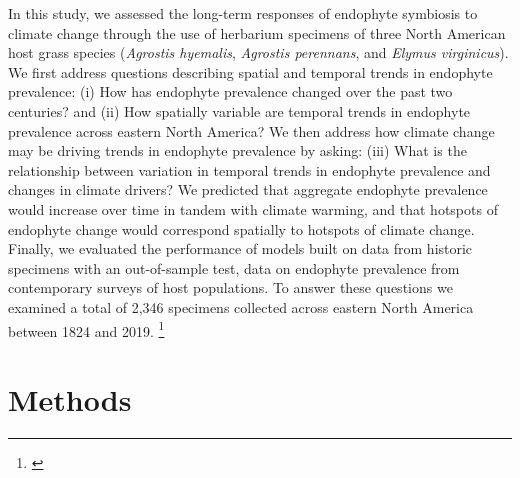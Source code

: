 \documentclass[11pt]{article}
\newcommand{\tom}[2]{{\color{red}{#1}}\footnote{\textit{\color{red}{#2}}}}
\begin{document}
In this study, we assessed the long-term responses of endophyte symbiosis to climate change through the use of herbarium specimens of three North American host grass species (\emph{Agrostis hyemalis}, \emph{Agrostis perennans}, and \emph{Elymus virginicus}).
We first address questions describing spatial and temporal trends in endophyte prevalence: (i) How has endophyte prevalence changed over the past two centuries? and (ii) How spatially variable are temporal trends in endophyte prevalence across eastern North America?
We then address how climate change may be driving trends in endophyte prevalence by asking: (iii) What is the relationship between variation in temporal trends in endophyte prevalence and changes in climate drivers?
We predicted that aggregate endophyte prevalence would increase over time in tandem with climate warming, and that hotspots of endophyte change would correspond spatially to hotspots of climate change. 
Finally, we evaluated the performance of models built on data from historic specimens with an out-of-sample test, data on endophyte prevalence from contemporary surveys of host populations. 
To answer these questions we examined a total of 2,346 specimens collected across eastern North America between 1824 and 2019.
\tom{}{I think the consensus was to keep the out-of-sample validation which should absolutely go into the Intro as an important element of novelty. Should go in the Asbtract too.}
	
\section*{Methods}
\end{document}
